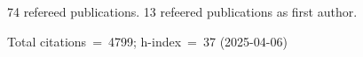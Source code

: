 74 refereed publications. 13 refeered publications as first author.

Total citations~=~4799; h-index~=~37 (2025-04-06)